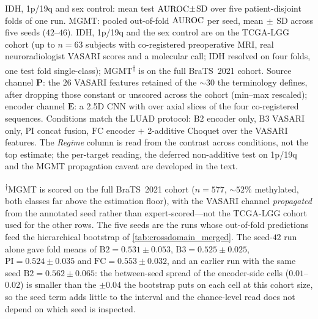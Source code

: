 \begin{flushleft}\footnotesize
IDH, 1p/19q and sex control: mean test $\text{AUROC}\pm$SD over five
patient-disjoint folds of one run. MGMT: pooled out-of-fold $\text{AUROC}$ per
seed, mean$\,\pm\,$SD across five seeds ($42$--$46$).
IDH, 1p/19q and the sex control are on the TCGA-LGG cohort
(up to $n=63$ subjects with co-registered preoperative MRI, real
neuroradiologist VASARI scores and a molecular call; IDH resolved on
four folds, one test fold single-class);
MGMT\textsuperscript{$\dagger$} is on the full BraTS~2021 cohort.
Source channel $\mathbf{P}$: the $26$ VASARI features retained of the
${\sim}30$ the terminology defines, after dropping those constant or
unscored across the cohort (min--max
rescaled); encoder channel $\mathbf{E}$: a 2.5D CNN with \abmil{} over
axial slices of the four co-registered sequences. Conditions match the
LUAD protocol: $\mathrm{B2}$ encoder only, $\mathrm{B3}$ VASARI only,
$\mathrm{PI}$ concat fusion, $\mathrm{FC}$ encoder $+$ 2-additive Choquet
over the VASARI features. The \emph{Regime} column is read from the
contrast across conditions, not the top estimate; the per-target reading,
the deferred non-additive test on 1p/19q and the MGMT propagation caveat
are developed in the text.
\par\smallskip
\textsuperscript{$\dagger$}MGMT is scored on the full BraTS~2021 cohort
($n\!=\!577$, ${\sim}52\%$ methylated, both classes far above the
estimation floor), with the VASARI channel \emph{propagated} from the
annotated seed rather than expert-scored---not the TCGA-LGG cohort used
for the other rows. The five seeds are the runs whose out-of-fold
predictions feed the hierarchical bootstrap of
\cref{tab:crossdomain_merged}. The seed-$42$ run alone gave fold means
of $\mathrm{B2}=0.531{\pm}0.053$, $\mathrm{B3}=0.525{\pm}0.025$,
$\mathrm{PI}=0.524{\pm}0.035$ and $\mathrm{FC}=0.553{\pm}0.032$, and an
earlier run with the same seed $\mathrm{B2}=0.562{\pm}0.065$: the
between-seed spread of the encoder-side cells ($0.01$--$0.02$) is
smaller than the ${\pm}0.04$ the bootstrap puts on each cell at this
cohort size, so the seed term adds little to the interval and the
chance-level read does not depend on which seed is inspected.
\end{flushleft}
